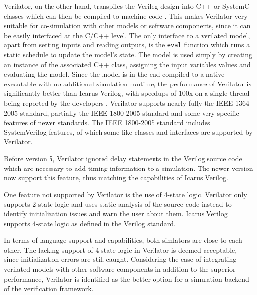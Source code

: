 Verilator, on the other hand, transpiles the Verilog design into C++ or SystemC classes which can then be compiled
to machine code \cite{verilator}. This makes Verilator very suitable for co-simulation with other models
or software components, since it can be easily interfaced at the C/C++ level. The only interface to a verilated
model, apart from setting inputs and reading outputs, is the \texttt{eval} function which runs a static schedule to
update the model's state. The model is used simply by creating an instance of the associated C++ class, assigning the
input variables values and evaluating the model. Since the model is in the end compiled to a native executable with
no additional simulation
runtime, the performance of Verilator is significantly better than Icarus Verilog, with speedups of 100x on a single
thread being reported by the developers \cite{verilator}. Verilator supports nearly fully the IEEE 1364-2005
standard, partially the IEEE 1800-2005 standard and some very specific features of newer standards. The IEEE
1800-2005 standard includes SystemVerilog features, of which some like classes and interfaces are supported by Verilator.

Before version 5, Verilator ignored delay statements in the Verilog source code which are necessary to add timing
information to a simulation. The newer version now support this feature, thus matching the capabilities of Icarus Verilog.

One feature not supported by Verilator is the use of 4-state logic. Verilator only supports 2-state logic and uses
static analysis of the source code instead to identify initialization issues and warn the user about them. Icarus
Verilog supports 4-state logic as defined in the Verilog standard.

In terms of language support and capabilities, both simlators are close to each other. The lacking support of 4-state
logic in Verilator is deemed acceptable, since initialization errors are still caught. Considering the ease of
integrating verilated models with other software components in addition to the
superior performance, Verilator is identified as the better option for a simulation backend of the verification framework.


